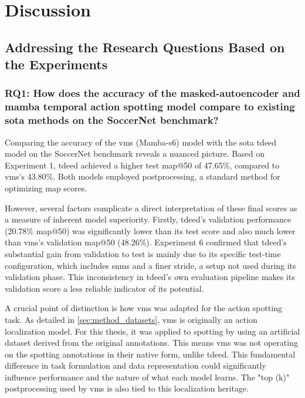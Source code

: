 \chapter{Discussion}
\label{chap:discussion}

\section{Addressing the Research Questions Based on the Experiments}
\label{sec:addressing_rq_based_on_experiments}

\subsection{RQ1: How does the accuracy of the masked-autoencoder and mamba temporal action spotting model compare to existing \acrfull{sota} methods on the SoccerNet benchmark?}

Comparing the accuracy of the \acrshort{vms} (Mamba-\acrshort{s6}) model with the \acrshort{sota} \acrshort{tdeed} model on the SoccerNet benchmark reveals a nuanced picture. Based on Experiment 1, \acrshort{tdeed} achieved a higher test \acrshort{map}@50 of 47.65\%, compared to \acrshort{vms}'s 43.80\%. Both models employed postprocessing, a standard method for optimizing \acrshort{map} scores.

However, several factors complicate a direct interpretation of these final scores as a measure of inherent model superiority. Firstly, \acrshort{tdeed}'s validation performance (20.78\% \acrshort{map}@50) was significantly lower than its test score and also much lower than \acrshort{vms}'s validation \acrshort{map}@50 (48.26\%). Experiment 6 confirmed that \acrshort{tdeed}'s substantial gain from validation to test is mainly due to its specific test-time configuration, which includes \acrfull{snms} and a finer stride, a setup not used during its validation phase. This inconsistency in \acrshort{tdeed}'s own evaluation pipeline makes its validation score a less reliable indicator of its potential.

A crucial point of distinction is how \acrshort{vms} was adapted for the action spotting task. As detailed in \cref{sec:method_datasets}, \acrshort{vms} is originally an action localization model. For this thesis, it was applied to spotting by using an artificial dataset derived from the original annotations. This means \acrshort{vms} was not operating on the spotting annotations in their native form, unlike \acrshort{tdeed}. This fundamental difference in task formulation and data representation could significantly influence performance and the nature of what each model learns. The "top (k)" postprocessing used by \acrshort{vms} is also tied to this localization heritage.


